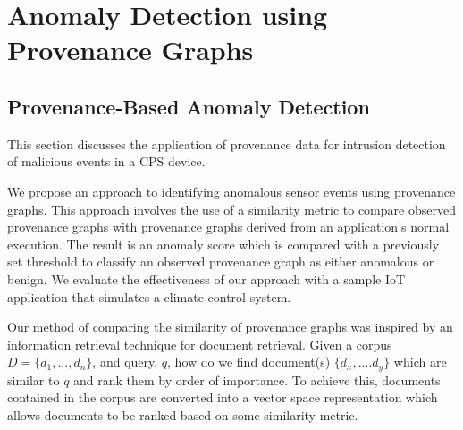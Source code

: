 
\chapter{Anomaly Detection using Provenance Graphs}
\section{Provenance-Based Anomaly Detection} \label{sec:prov_anomaly}
This section discusses the application of provenance data for intrusion detection of malicious events in a CPS device. 


 \par We propose an approach to identifying anomalous sensor events using provenance graphs. This approach involves the use of a similarity metric to compare observed provenance graphs with provenance graphs derived from an application's normal execution. The result is an anomaly score which is  compared with a previously set threshold to classify an observed provenance graph as either anomalous or benign. We evaluate the effectiveness of our approach with a sample IoT application that simulates a climate control system.
 
 \par Our method of comparing the similarity of provenance graphs was inspired by an information retrieval technique for document retrieval. Given a corpus $D = \{ d_1,..., d_n\}$, and query, $q$, how do we find document(s) $\{d_x,....d_y\}$ which are similar to $q$ and rank them by order of importance. To achieve this, documents contained in the corpus are converted into a vector space representation which allows documents to be ranked based on some similarity metric.


